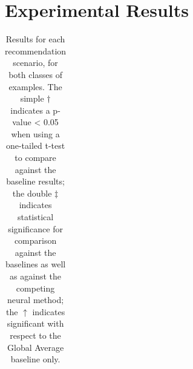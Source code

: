 \documentclass[journal,article,submit,moreauthors,pdftex]{Definitions/mdpi}
\begin{document}
\section{Experimental Results}
\label{sec:results}

\begin{table}[t]\setlength{\tabcolsep}{4pt}
\caption{Results for each recommendation scenario, for both classes of examples. The simple $\dagger$ indicates a p-value < 0.05 when using a one-tailed t-test to compare against the baseline results; the double $\ddagger$ indicates statistical significance for comparison against the baselines as well as against the competing neural method; the $\uparrow$ indicates significant with respect to the Global Average baseline only.}
\begin{center}
\label{tab:results}
\begin{tabular}{|l|rr|rr|}


\end{tabular}
\end{center}
\end{table}
\end{document}
